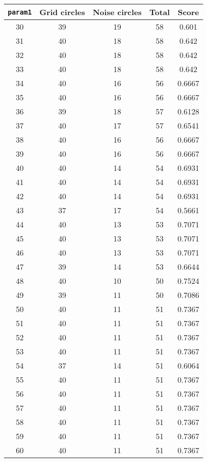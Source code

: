 \documentclass[letterpaper, 12pt]{article}
\begin{document}
\begin{longtable}{|c|c|c|c|c|}
\hline
\textbf{\texttt{param1}} & \textbf{Grid circles} & \textbf{Noise circles} & \textbf{Total} & \textbf{Score} \\
\hline
30 & 39 & 19 & 58 & 0.601 \\
\hline
31 & 40 & 18 & 58 & 0.642 \\
\hline
32 & 40 & 18 & 58 & 0.642 \\
\hline
33 & 40 & 18 & 58 & 0.642 \\
\hline
34 & 40 & 16 & 56 & 0.6667 \\
\hline
35 & 40 & 16 & 56 & 0.6667 \\
\hline
36 & 39 & 18 & 57 & 0.6128 \\
\hline
37 & 40 & 17 & 57 & 0.6541 \\
\hline
38 & 40 & 16 & 56 & 0.6667 \\
\hline
39 & 40 & 16 & 56 & 0.6667 \\
\hline
40 & 40 & 14 & 54 & 0.6931 \\
\hline
41 & 40 & 14 & 54 & 0.6931 \\
\hline
42 & 40 & 14 & 54 & 0.6931 \\
\hline
43 & 37 & 17 & 54 & 0.5661 \\
\hline
44 & 40 & 13 & 53 & 0.7071 \\
\hline
45 & 40 & 13 & 53 & 0.7071 \\
\hline
46 & 40 & 13 & 53 & 0.7071 \\
\hline
47 & 39 & 14 & 53 & 0.6644 \\
\hline
48 & 40 & 10 & 50 & 0.7524 \\
\hline
49 & 39 & 11 & 50 & 0.7086 \\
\hline
50 & 40 & 11 & 51 & 0.7367 \\
\hline
51 & 40 & 11 & 51 & 0.7367 \\
\hline
52 & 40 & 11 & 51 & 0.7367 \\
\hline
53 & 40 & 11 & 51 & 0.7367 \\
\hline
54 & 37 & 14 & 51 & 0.6064 \\
\hline
55 & 40 & 11 & 51 & 0.7367 \\
\hline
56 & 40 & 11 & 51 & 0.7367 \\
\hline
57 & 40 & 11 & 51 & 0.7367 \\
\hline
58 & 40 & 11 & 51 & 0.7367 \\
\hline
59 & 40 & 11 & 51 & 0.7367 \\
\hline
60 & 40 & 11 & 51 & 0.7367 \\

\end{longtable}
\end{document}

